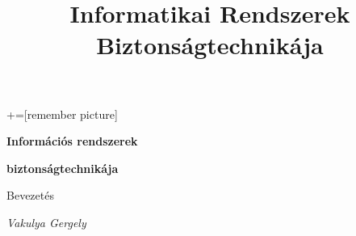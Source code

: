 \documentclass[12 pt]{beamer}
\author{}
\title{Informatikai Rendszerek Biztonságtechnikája}
\institute{}
\date{}
\newcommand{\titleimage}{title}			%
\begin{document}
+=[remember picture]

{

\begin{frame}[c]
\begin{center}

  \Large
  \textbf{Információs rendszerek}

  \textbf{biztonságtechnikája}

  \qquad
  
  Bevezetés
  
  \qquad

  \textit{Vakulya Gergely}




	
	

\end{center}
\end{frame}}
\end{document}
